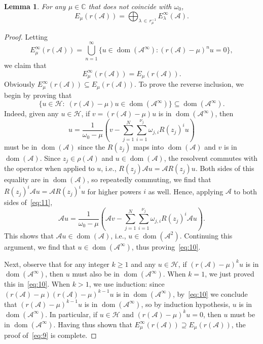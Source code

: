 \documentclass[12pt, oneside, reqno]{amsart}
\newtheorem{lemma}[theorem]{Lemma}
\theoremstyle{remark}
\DeclareMathOperator{\dom}{dom}
\newcommand{\CC}{\mathbb{C}}
\newcommand{\nquad}{N}
\newcommand{\Ac}{\mathcal{A}}
\newcommand{\Hc}{\mathcal{H}}
\newcommand{\og}{\omega}
\begin{document}
\begin{lemma}
  \label{lem:rational-gen-eigenspaces}
  For any $\mu\in \CC$ that does not coincide with  $\og_0$,
  \begin{equation}
    \label{eq:13}    
    E_\mu(r(\Ac)) = \bigoplus_{\lambda \,\in\, r^{-1}_\mu } E_\lambda^\infty (\Ac).
  \end{equation}
\end{lemma}
  
\begin{proof}
  Letting 
  \[
    E_\mu^\infty(r(\Ac)) =
    \bigcup_{n=1}^\infty \{ u \in \dom (\Ac^\infty) : (r(\Ac) - \mu )^n u = 0\},
  \]
  we claim that
  \begin{equation}
    \label{eq:9}
    E_\mu^\infty(r(\Ac)) = E_\mu(r(\Ac)). 
  \end{equation}
  Obviously $E_\mu^\infty(r(\Ac)) \subseteq E_\mu(r(\Ac)).$ To prove
  the reverse inclusion, we begin by proving that 
  \begin{equation}
    \label{eq:10}
    \{ u \in \Hc: \; (r(\Ac) - \mu) u \in \dom (\Ac^\infty) \}
    \subseteq  \dom (\Ac^\infty).
  \end{equation}
  Indeed, given any $u \in \Hc$, if $v = (r(\Ac) - \mu ) u$ is in
  $\dom(\Ac^\infty)$, then
  \begin{equation}
    \label{eq:11}
    u = \frac{1}{\og_0-\mu}\left( v -
      \sum_{j=1}^\nquad \sum_{i=1}^{\nu_j}\omega_{j, i} R(z_j)^i
      u\right)
  \end{equation}
  must be in $\dom (\Ac)$ since the $R(z_j)$ maps into
  $\dom (\Ac)$ and $v$ is in $\dom (\Ac)$. Since $z_j \in \rho(\Ac)$ and $u \in\dom(\Ac)$, the resolvent commutes with the operator when applied to $u$, i.e.,
  $R(z_j) \Ac u = \Ac  R(z_j) u$.
  Both sides of this equality are in $\dom (\Ac)$, so repeatedly commuting,
  we find that
  $R(z_j)^i \Ac u = \Ac  R(z_j)^i u$ for higher powers $i$ as well.  
  Hence, applying $\Ac$ to both sides of~\eqref{eq:11},
  \begin{equation}
    \label{eq:12}
    \Ac u = \frac{1}{\og_0 - \mu}\left( \Ac v -
      \sum_{j=1}^\nquad \sum_{i=1}^{\nu_j}\omega_{j, i} R(z_j)^i
      \Ac u\right).
  \end{equation}
  This shows  that $\Ac u \in \dom (\Ac)$, i.e., $u \in \dom
  (\Ac^2)$. Continuing this argument, we find that
  $u \in \dom (\Ac^\infty)$, thus proving~\eqref{eq:10}.

  Next, observe that for any integer $k \ge 1$ and any $u \in \Hc$, if
  $(r(\Ac) - \mu)^ku$ is in $\dom (\Ac^\infty)$, then $u$ must also be
  in $ \dom(\Ac^\infty)$. When $k=1$, we just proved this
  in~\eqref{eq:10}. When $k>1$, we use induction: since
  $(r(\Ac) - \mu) (r(\Ac) - \mu)^{k-1}u$ is in $\dom (\Ac^\infty)$,
  by~\eqref{eq:10} we conclude that $(r(\Ac) - \mu)^{k-1}u$ is in
  $\dom (\Ac^\infty)$, so by induction hypothesis, $u$ is in
  $\dom (\Ac^\infty)$.  In particular, if $u \in \Hc$ and
  $(r(\Ac) - \mu)^ku = 0$, then $u$ must be in $\dom
  (\Ac^\infty)$. Having thus shown that
  $E_\mu^\infty(r(\Ac)) \supseteq E_\mu(r(\Ac))$, the proof
  of~\eqref{eq:9} is complete.



\end{proof}
\end{document}
